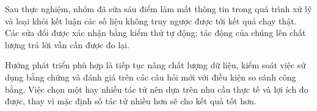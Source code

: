 Sau thực nghiệm, nhóm đã sửa sáu điểm làm mất thông tin trong quá trình xử lý và loại khỏi kết luận các số liệu không truy ngược được tới kết quả chạy thật. Các sửa đổi được xác nhận bằng kiểm thử tự động; tác động của chúng lên chất lượng trả lời vẫn cần được đo lại.

Hướng phát triển phù hợp là tiếp tục nâng chất lượng dữ liệu, kiểm soát việc sử dụng bằng chứng và đánh giá trên các câu hỏi mới với điều kiện so sánh công bằng. Việc chọn một hay nhiều tác tử nên dựa trên nhu cầu thực tế và lợi ích đo được, thay vì mặc định số tác tử nhiều hơn sẽ cho kết quả tốt hơn.

